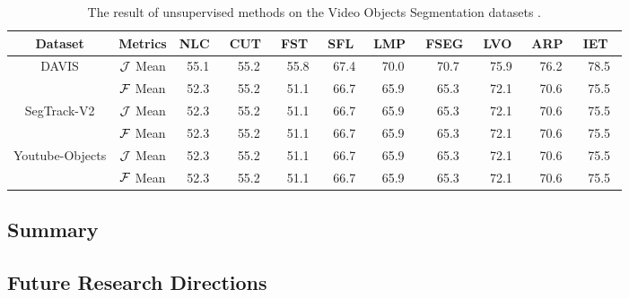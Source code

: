 \begin{table*}[t!h]
	\begin{center}
		\begin{tabular}{|c|c|c|c|c|c|c|c|c|c|c|}
			\hline
			Dataset& Metrics&NLC~\cite{Faktor2014Video} &CUT~\cite{Keuper2015Motion} &FST~\cite{Papazoglou2013Fast} &SFL~\cite{Cheng2017SegFlow:} &LMP~\cite{Tokmakov2017Learninga} &FSEG~\cite{Jain2017FusionSeg:} &LVO~\cite{Tokmakov2017Learning} & ARP~\cite{Koh2017Primary} 
			&IET~\cite{Li2018Instance} \\
			\hline
			\multirow{2}{*}{DAVIS} &$\mathcal{J}$ Mean &55.1 &55.2 &55.8 &67.4 &70.0 &70.7 &75.9 &76.2 &78.5 \\
			\cline{2-11}
			&$\mathcal{F}$ Mean &52.3 &55.2 &51.1 &66.7 &65.9 &65.3 &72.1 &70.6 &75.5 \\
			\hline
			\multirow{2}{*}{SegTrack-V2} &$\mathcal{J}$ Mean &52.3 &55.2 &51.1 &66.7 &65.9 &65.3 &72.1 &70.6 &75.5 \\
			\cline{2-11}
			&$\mathcal{F}$ Mean &52.3 &55.2 &51.1 &66.7 &65.9 &65.3 &72.1 &70.6 &75.5 \\
			\hline

			\multirow{2}{*}{Youtube-Objects} &$\mathcal{J}$ Mean &52.3 &55.2 &51.1 &66.7 &65.9 &65.3 &72.1 &70.6 &75.5 \\
			\cline{2-11}
			&$\mathcal{F}$ Mean &52.3 &55.2 &51.1 &66.7 &65.9 &65.3 &72.1 &70.6 &75.5 \\
			\hline
		\end{tabular}
	\end{center}
	\caption{The result of unsupervised methods on the Video Objects Segmentation datasets .}
	\label{table:unsuperivsed_all_dataset}
\end{table*}
\subsection{Summary}

\subsection{Future Research Directions}